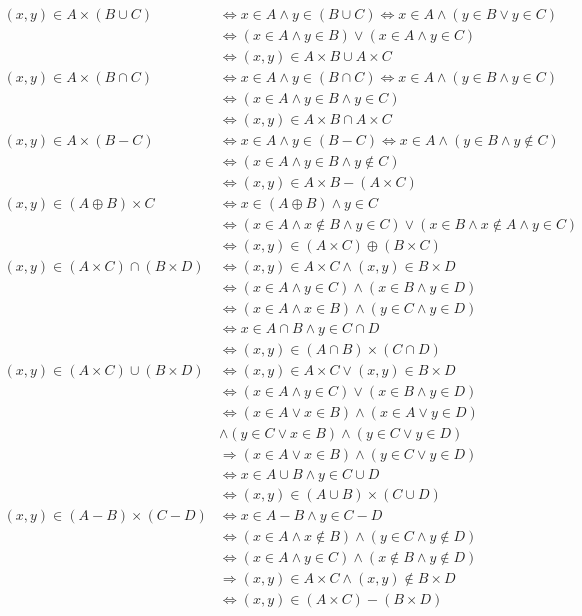 \documentclass[lang=cn,11pt]{elegantbook}
\begin{document}
\begin{align*}
(x,y)\in A\times(B\cup C)&\Leftrightarrow x\in A\land y\in (B\cup C)\Leftrightarrow x\in A\land (y\in B\lor y\in C)\\
&\Leftrightarrow (x\in A\land y\in B)\lor(x\in A\land y\in C)\\&\Leftrightarrow (x,y)\in A\times B\cup A\times C\\
(x,y)\in A\times(B\cap C)&\Leftrightarrow x\in A\land y\in (B\cap C)\Leftrightarrow x\in A\land (y\in B\land y\in C)\\
&\Leftrightarrow (x\in A\land y\in B\land y\in C)\\&\Leftrightarrow (x,y)\in A\times B\cap A\times C\\
(x,y)\in A\times(B-C)&\Leftrightarrow x\in A\land y\in (B-C)\Leftrightarrow x\in A\land (y\in B\land y\not\in C)\\
&\Leftrightarrow (x\in A\land y\in B\land y\not\in C)\\&\Leftrightarrow (x,y)\in A\times B-(A\times C)\\
(x,y)\in (A\oplus B)\times C&\Leftrightarrow x\in (A\oplus B)\land y\in C\\
&\Leftrightarrow (x\in A\land x\not\in B\land y\in C)\lor(x\in B\land x\not\in A\land y\in C)\\
&\Leftrightarrow (x,y)\in(A\times C)\oplus(B\times C)\\
(x,y) \in (A \times C) \cap (B \times D) &\Leftrightarrow (x,y) \in A \times C \land (x,y) \in B \times D \\
&\Leftrightarrow (x \in A \land y \in C) \land (x \in B \land y \in D) \\
&\Leftrightarrow (x \in A \land x \in B) \land (y \in C \land y \in D) \\
&\Leftrightarrow x \in A \cap B \land y \in C \cap D \\
&\Leftrightarrow (x,y) \in (A \cap B) \times (C \cap D)\\
(x,y) \in (A \times C) \cup (B \times D) &\Leftrightarrow (x,y) \in A \times C \lor (x,y) \in B \times D \\
&\Leftrightarrow (x \in A \land y \in C) \lor (x \in B \land y \in D) \\
&\Leftrightarrow (x\in A\lor x\in B)\land(x\in A\lor y\in D)\\ &\land(y\in C\lor x\in B)\land(y\in C\lor y\in D)\\
&\Rightarrow (x \in A \lor x \in B) \land (y \in C \lor y \in D)\\
&\Leftrightarrow x \in A \cup B \land y \in C \cup D \\
&\Leftrightarrow (x,y) \in (A \cup B) \times (C \cup D)\\
(x,y) \in (A - B) \times (C - D) &\Leftrightarrow x \in A - B \land y \in C - D \\
&\Leftrightarrow (x \in A \land x \notin B) \land (y \in C \land y \notin D) \\
&\Leftrightarrow (x \in A \land y \in C) \land (x \notin B \land y \notin D) \\
&\Rightarrow (x,y) \in A \times C \land (x,y) \notin B \times D \\
&\Leftrightarrow (x,y) \in (A \times C) - (B \times D)
\end{align*}
\end{document}
